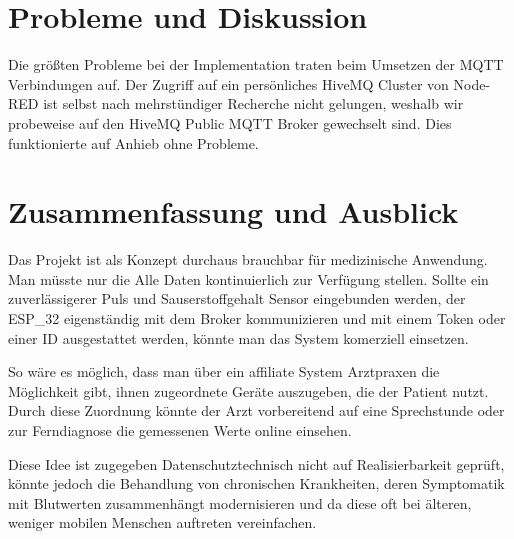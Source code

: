 \documentclass[12pt,oneside]{article}
\begin{document}
  
  \section{Probleme und Diskussion}
	Die grö\ss ten Probleme bei der Implementation traten beim Umsetzen der MQTT Verbindungen auf. Der Zugriff auf ein persönliches HiveMQ Cluster von Node-RED ist selbst nach mehrstündiger Recherche nicht gelungen, weshalb wir probeweise auf den HiveMQ Public MQTT Broker gewechselt sind. Dies funktionierte auf Anhieb ohne Probleme.
  
  
  \section{Zusammenfassung und Ausblick}
	Das Projekt ist als Konzept durchaus brauchbar für medizinische Anwendung. Man müsste nur die Alle Daten kontinuierlich zur Verfügung stellen. Sollte ein zuverlässigerer Puls und Sauserstoffgehalt Sensor eingebunden werden, der ESP\_32 eigenständig mit dem Broker kommunizieren und mit einem Token oder einer ID ausgestattet werden, könnte man das System komerziell einsetzen.\par
	So wäre es möglich, dass man über ein affiliate System Arztpraxen die Möglichkeit gibt, ihnen zugeordnete Geräte auszugeben, die der Patient nutzt. Durch diese Zuordnung könnte der Arzt vorbereitend auf eine Sprechstunde oder zur Ferndiagnose die gemessenen Werte online einsehen. \par
	Diese Idee ist zugegeben Datenschutztechnisch nicht auf Realisierbarkeit geprüft, könnte jedoch die Behandlung von chronischen Krankheiten, deren Symptomatik mit Blutwerten zusammenhängt modernisieren und da diese oft bei älteren, weniger mobilen Menschen auftreten vereinfachen.
  
  \clearpage 
  
  \listoffigures
  \lstlistoflistings
  
  
  
  
\end{document}
